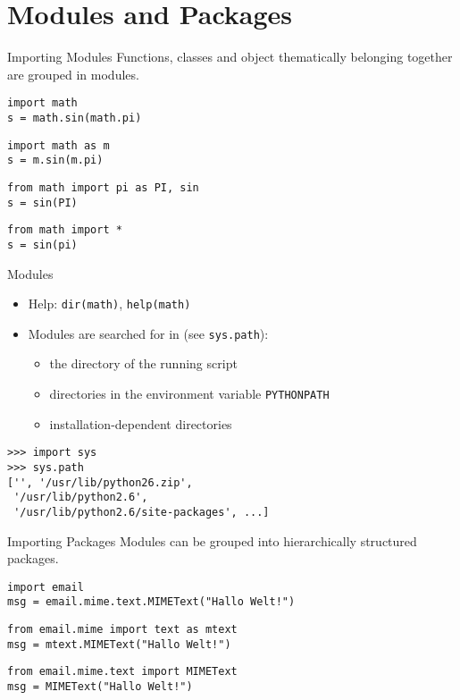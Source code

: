 \section{Modules and Packages}

\begin{frame}[fragile]{Importing Modules}
Functions, classes and object thematically belonging together are grouped in modules.
\begin{lstlisting}[style=Python]
import math
s = math.sin(math.pi)
\end{lstlisting}
\begin{lstlisting}[style=Python]
import math as m
s = m.sin(m.pi)
\end{lstlisting}
\begin{lstlisting}[style=Python]
from math import pi as PI, sin
s = sin(PI)
\end{lstlisting}
\begin{lstlisting}[style=Python]
from math import *
s = sin(pi)
\end{lstlisting}
\end{frame}

\begin{frame}[fragile]{Modules}
\begin{itemize}
\item Help: \lstinline{dir(math)}, \lstinline{help(math)}
\item Modules are searched for in (see \lstinline{sys.path}):
\begin{itemize}
\item the directory of the running script
\item directories in the environment variable \texttt{PYTHONPATH}
\item installation-dependent directories
\end{itemize}
\end{itemize}
\begin{lstlisting}[style=Shell]
>>> import sys
>>> sys.path
['', '/usr/lib/python26.zip',
 '/usr/lib/python2.6', 
 '/usr/lib/python2.6/site-packages', ...]
\end{lstlisting}
\end{frame}

\begin{frame}[fragile]{Importing Packages}
Modules can be grouped into hierarchically structured packages.
\begin{lstlisting}[style=Python]
import email
msg = email.mime.text.MIMEText("Hallo Welt!")
\end{lstlisting}
\begin{lstlisting}[style=Python]
from email.mime import text as mtext
msg = mtext.MIMEText("Hallo Welt!")
\end{lstlisting}
\begin{lstlisting}[style=Python]
from email.mime.text import MIMEText
msg = MIMEText("Hallo Welt!")
\end{lstlisting}
\end{frame}

